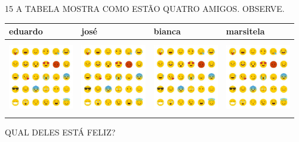 
\num{15} A TABELA MOSTRA COMO ESTÃO QUATRO AMIGOS. OBSERVE.


\begin{longtable}[]{@{}llll@{}}
\toprule
eduardo & josé & bianca & marsitela\tabularnewline
\midrule
\endhead
\includegraphics[width=1.11765in,height=1.26042in]{media/image139.jpg} &
\includegraphics[width=1.11765in,height=1.26042in]{media/image139.jpg} &
\includegraphics[width=1.11765in,height=1.12806in]{media/image139.jpg} &
\includegraphics[width=1.11765in,height=1.12806in]{media/image139.jpg}\tabularnewline
\bottomrule
\end{longtable}

QUAL DELES ESTÁ FELIZ?

